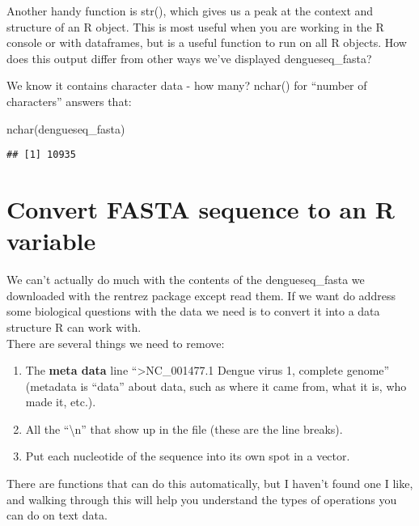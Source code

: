 \documentclass[
]{book}
\newenvironment{Shaded}{\begin{snugshade}}{\end{snugshade}}
\newcommand{\FunctionTok}[1]{\textcolor[rgb]{0.00,0.00,0.00}{#1}}
\newcommand{\NormalTok}[1]{#1}
\providecommand{\tightlist}{%
  \setlength{\itemsep}{0pt}\setlength{\parskip}{0pt}}
\begin{document}
Another handy function is str(), which gives us a peak at the context and structure of an R object. This is most useful when you are working in the R console or with dataframes, but is a useful function to run on all R objects. How does this output differ from other ways we've displayed dengueseq\_fasta?

We know it contains character data - how many? nchar() for ``number of characters'' answers that:

\begin{Shaded}
\begin{Highlighting}[]
\FunctionTok{nchar}\NormalTok{(dengueseq\_fasta)}
\end{Highlighting}
\end{Shaded}

\begin{verbatim}
## [1] 10935
\end{verbatim}

\hypertarget{convert-fasta-sequence-to-an-r-variable}{%
\section{Convert FASTA sequence to an R variable}\label{convert-fasta-sequence-to-an-r-variable}}

We can't actually do much with the contents of the dengueseq\_fasta we downloaded with the rentrez package except read them. If we want do address some biological questions with the data we need is to convert it into a data structure R can work with.\\
There are several things we need to remove:

\begin{enumerate}
\def\labelenumi{\arabic{enumi}.}
\tightlist
\item
  The \textbf{meta data} line ``\textgreater NC\_001477.1 Dengue virus 1, complete genome'' (metadata is ``data'' about data, such as where it came from, what it is, who made it, etc.).
\item
  All the ``\textbackslash n'' that show up in the file (these are the line breaks).
\item
  Put each nucleotide of the sequence into its own spot in a vector.
\end{enumerate}

There are functions that can do this automatically, but I haven't found one I like, and walking through this will help you understand the types of operations you can do on text data.
\end{document}
